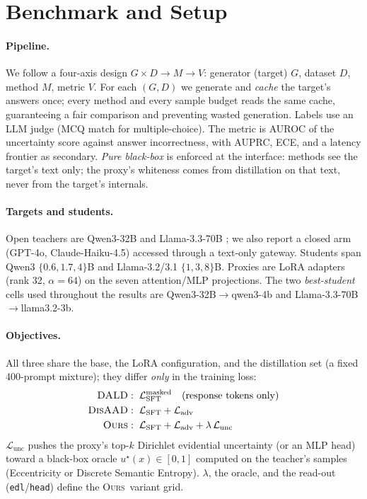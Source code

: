 \documentclass[11pt]{article}
\newcommand{\ours}{\textsc{Ours}}
\newcommand{\dald}{\textsc{DALD}}
\newcommand{\disaad}{\textsc{DisAAD}}
\begin{document}
\section{Benchmark and Setup}\label{sec:setup}
\paragraph{Pipeline.} We follow a four-axis design $G\times D\to M\to V$: generator
(target) $G$, dataset $D$, method $M$, metric $V$. For each $(G,D)$ we generate and
\emph{cache} the target's answers once; every method and every sample budget reads the
same cache, guaranteeing a fair comparison and preventing wasted generation. Labels use
an LLM judge (MCQ match for multiple-choice). The metric is AUROC of the uncertainty
score against answer incorrectness, with AUPRC, ECE, and a latency frontier as
secondary. \emph{Pure black-box} is enforced at the interface: methods see the target's
text only; the proxy's whiteness comes from distillation on that text, never from the
target's internals.

\paragraph{Targets and students.} Open teachers are Qwen3-32B \citep{yang2024qwen3} and
Llama-3.3-70B \citep{dubey2024llama3}; we also report a closed arm (GPT-4o,
Claude-Haiku-4.5) accessed through a text-only gateway. Students span Qwen3
$\{0.6,1.7,4\}$B and Llama-3.2/3.1 $\{1,3,8\}$B. Proxies are LoRA adapters
\citep{hu2022lora} (rank 32, $\alpha{=}64$) on the seven attention/MLP projections. The
two \emph{best-student} cells used throughout the results are Qwen3-32B$\to$qwen3-4b and
Llama-3.3-70B$\to$llama3.2-3b.

\paragraph{Objectives.} All three share the base, the LoRA configuration, and the
distillation set (a fixed 400-prompt mixture); they differ \emph{only} in the training
loss:
\[
\begin{aligned}
\dald  &: \; \mathcal{L}_{\text{SFT}}^{\text{masked}} \quad(\text{response tokens only})\\
\disaad&: \; \mathcal{L}_{\text{SFT}} + \mathcal{L}_{\text{adv}}\\
\ours  &: \; \mathcal{L}_{\text{SFT}} + \mathcal{L}_{\text{adv}} + \lambda\,\mathcal{L}_{\text{unc}}
\end{aligned}
\]
$\mathcal{L}_{\text{unc}}$ pushes the proxy's top-$k$ Dirichlet evidential uncertainty
(or an MLP head) toward a black-box oracle $u^\star(x)\in[0,1]$ computed on the
teacher's samples (Eccentricity or Discrete Semantic Entropy). $\lambda$, the oracle,
and the read-out (\texttt{edl}/\texttt{head}) define the \ours\ variant grid.
\end{document}
